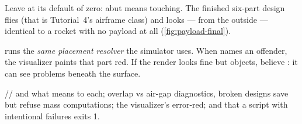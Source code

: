 Leave  at its default of zero: abut means touching. The finished
six-part design flies (that is Tutorial~4's airframe class) and looks ---
from the outside --- identical to a rocket with no payload at all
(\cref{fig:payload-final}).


\begin{warning}
 runs the \emph{same placement resolver} the
simulator uses. When  names an offender, the visualizer
paints that part red. If the
render looks fine but  objects, believe :
it can see problems beneath the surface.
\end{warning}

\begin{tip}
// and what  means to
each; overlap vs air-gap diagnostics, broken designs
save but refuse mass computations; the visualizer's error-red; and that a script with
intentional failures exits 1.
\end{tip}
